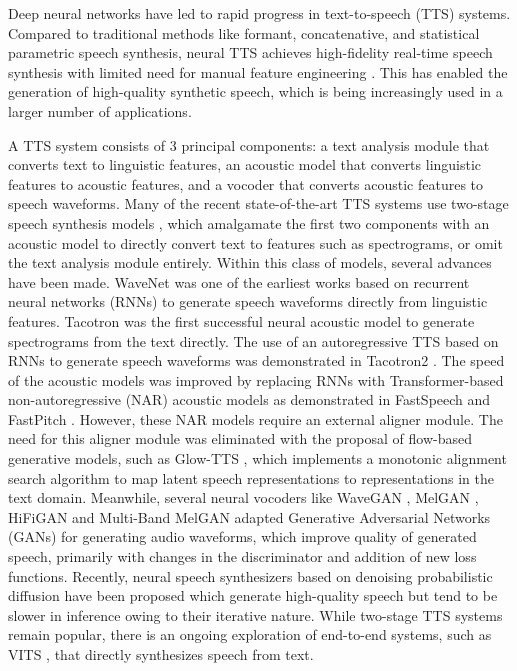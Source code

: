 \documentclass{article}
\begin{document}
Deep neural networks have led to rapid progress in text-to-speech (TTS) systems. Compared to traditional methods like formant, concatenative, and statistical parametric speech synthesis, neural TTS achieves high-fidelity real-time speech synthesis with limited need for manual feature engineering \cite{tan2021survey}. This has enabled the generation of high-quality synthetic speech, which is being increasingly used in a larger number of applications.


A TTS system consists of 3 principal components: a text analysis module that converts text to linguistic features, an acoustic model that converts linguistic features to acoustic features, and a vocoder that converts acoustic features to speech waveforms. 
Many of the recent state-of-the-art TTS systems use two-stage speech synthesis models \cite{shen2018natural, kim2020glow, ren2019fastspeech, lancucki2021fastpitch}, which amalgamate the first two components with an acoustic model to directly convert text to features such as spectrograms, or omit the text analysis module entirely.
Within this class of models, several advances have been made.
WaveNet \cite{oord2016wavenet} was one of the earliest works based on recurrent neural networks (RNNs) to generate speech waveforms directly from linguistic features.
Tacotron \cite{wang2017tacotron} was the first successful neural acoustic model to generate spectrograms from the text directly.
The use of an autoregressive TTS based on RNNs to generate speech waveforms was demonstrated in Tacotron2 \cite{shen2018natural}.
The speed of the acoustic models was improved by replacing RNNs with Transformer-based non-autoregressive (NAR) acoustic models as demonstrated in FastSpeech \cite{ren2019fastspeech} and FastPitch \cite{lancucki2021fastpitch}.
However, these NAR models require an external aligner module.
The need for this aligner module was eliminated with the proposal of flow-based generative models, such as Glow-TTS \cite{kim2020glow}, which implements a monotonic alignment search algorithm to map latent speech representations to representations in the text domain. 
Meanwhile, several neural vocoders like WaveGAN \cite{donahue2018adversarial}, MelGAN \cite{kumar2019melgan}, HiFiGAN \cite{kong2020hifi} and Multi-Band MelGAN \cite{yang2021multi} adapted Generative Adversarial Networks (GANs) for generating audio waveforms, which improve quality of generated speech, primarily with changes in the discriminator and addition of new loss functions.
Recently, neural speech synthesizers \cite{jeong2021diff,popov2021grad} based on denoising probabilistic diffusion have been proposed which generate high-quality speech but tend to be slower in inference owing to their iterative nature. 
While two-stage TTS systems remain popular, there is an ongoing exploration of end-to-end systems, such as VITS \cite{kim2021conditional}, that  directly synthesizes speech from text.
\end{document}
